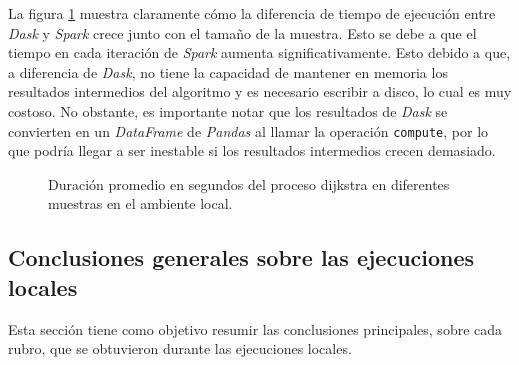 La figura \ref{lineas:local-dijkstra} muestra claramente cómo la diferencia de tiempo de ejecución entre \textit{Dask} y \textit{Spark} crece junto con el tamaño de la muestra. Esto se debe a que el tiempo en cada iteración de \textit{Spark} aumenta significativamente. Esto debido a que, a diferencia de \textit{Dask}, no tiene la capacidad de mantener en memoria los resultados intermedios del algoritmo y es necesario escribir a disco, lo cual es muy costoso. No obstante, es importante notar que los resultados de \textit{Dask} se convierten en un \textit{DataFrame} de \textit{Pandas} al llamar la operación \texttt{compute}, por lo que podría llegar a ser inestable si los resultados intermedios crecen demasiado.

\begin{figure}
\centering
{}
\caption{Duración promedio en segundos del proceso dijkstra en diferentes muestras en el ambiente local.}
\label{lineas:local-dijkstra}
\end{figure}

\subsection{Conclusiones generales sobre las ejecuciones locales}

Esta sección tiene como objetivo resumir las conclusiones principales, sobre cada rubro, que se obtuvieron durante las ejecuciones locales.


